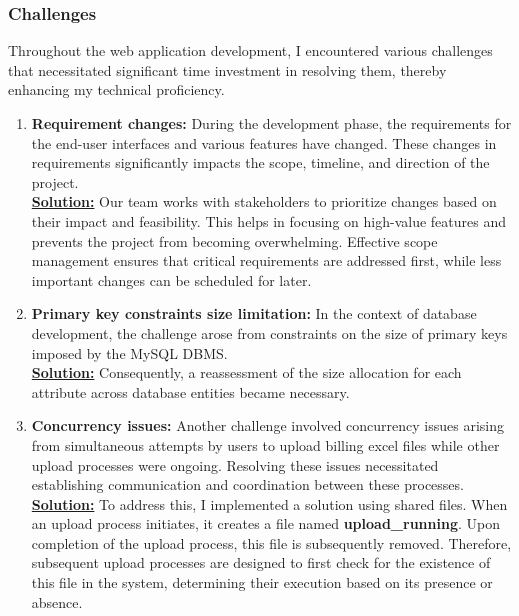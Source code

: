     \subsubsection{Challenges}
    Throughout the web application development, I encountered various challenges that necessitated significant time investment in resolving them, thereby enhancing my technical proficiency.

    \begin{enumerate}
        \item \textbf{Requirement changes: } During the development phase, the requirements for the end-user interfaces and various features have changed. These changes in requirements significantly impacts the scope, timeline, and direction of the project. \\ 
        \textbf{\underline{Solution:}} Our team works with stakeholders to prioritize changes based on their impact and feasibility. This helps in focusing on high-value features and prevents the project from becoming overwhelming. Effective scope management ensures that critical requirements are addressed first, while less important changes can be scheduled for later.
        
        \item \textbf{Primary key constraints size limitation:} In the context of database development, the challenge arose from constraints on the size of primary keys imposed by the MySQL DBMS. \\ 
        \textbf{\underline{Solution:}} Consequently, a reassessment of the size allocation for each attribute across database entities became necessary.

        \item \textbf{Concurrency issues:} Another challenge involved concurrency issues arising from simultaneous attempts by users to upload billing excel files while other upload processes were ongoing. Resolving these issues necessitated establishing communication and coordination between these processes. \\ 
        \textbf{\underline{Solution:}} To address this, I implemented a solution using shared files. When an upload process initiates, it creates a file named \textbf{upload\_running}. Upon completion of the upload process, this file is subsequently removed. Therefore, subsequent upload processes are designed to first check for the existence of this file in the system, determining their execution based on its presence or absence.



\end{enumerate}
